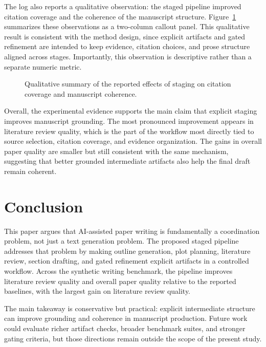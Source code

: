 \documentclass{article}
\begin{document}
The log also reports a qualitative observation: the staged pipeline improved citation coverage and the coherence of the manuscript structure. Figure~\cref{fig:grounding} summarizes these observations as a two-column callout panel. This qualitative result is consistent with the method design, since explicit artifacts and gated refinement are intended to keep evidence, citation choices, and prose structure aligned across stages. Importantly, this observation is descriptive rather than a separate numeric metric.

\begin{figure}[t]
  \centering
  
  \caption{Qualitative summary of the reported effects of staging on citation coverage and manuscript coherence.}
  \label{fig:grounding}
\end{figure}

Overall, the experimental evidence supports the main claim that explicit staging improves manuscript grounding. The most pronounced improvement appears in literature review quality, which is the part of the workflow most directly tied to source selection, citation coverage, and evidence organization. The gains in overall paper quality are smaller but still consistent with the same mechanism, suggesting that better grounded intermediate artifacts also help the final draft remain coherent.

\section{Conclusion}

This paper argues that AI-assisted paper writing is fundamentally a coordination problem, not just a text generation problem. The proposed staged pipeline addresses that problem by making outline generation, plot planning, literature review, section drafting, and gated refinement explicit artifacts in a controlled workflow. Across the synthetic writing benchmark, the pipeline improves literature review quality and overall paper quality relative to the reported baselines, with the largest gain on literature review quality.

The main takeaway is conservative but practical: explicit intermediate structure can improve grounding and coherence in manuscript production. Future work could evaluate richer artifact checks, broader benchmark suites, and stronger gating criteria, but those directions remain outside the scope of the present study.
\end{document}
